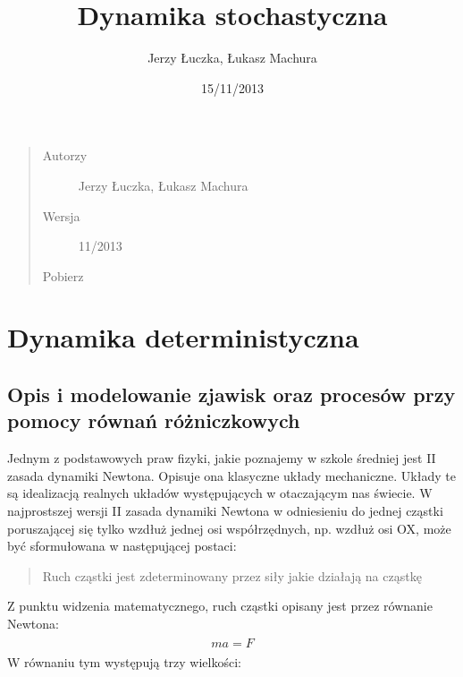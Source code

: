 \documentclass[a4paper,12pt,polish]{sphinxmanual}
\title{Dynamika stochastyczna}
\date{15/11/2013}
\author{Jerzy Łuczka, Łukasz Machura}
\begin{document}
\maketitle
\tableofcontents
{}\label{index::doc}

\begin{quote}\begin{description}
\item[{Autorzy}] \leavevmode
Jerzy Łuczka,
Łukasz Machura

\item[{Wersja}]  11/2013

\item[{Pobierz}] \leavevmode
{}

\end{description}\end{quote}


\chapter{Dynamika deterministyczna}
\label{index:dynamika-stochastyczna}\label{index:dynamika-deterministyczna}

\section{Opis i modelowanie zjawisk oraz procesów przy pomocy równań różniczkowych}
\label{ch1/chI011:opis-i-modelowanie-zjawisk-oraz-procesow-przy-pomocy-rownan-rozniczkowych}\label{ch1/chI011::doc}
Jednym z podstawowych praw fizyki, jakie poznajemy w szkole średniej jest II zasada dynamiki Newtona. Opisuje ona klasyczne układy mechaniczne. Układy te są idealizacją realnych układów występujących w otaczającym nas świecie. W najprostszej wersji II zasada dynamiki Newtona w odniesieniu do jednej cząstki poruszającej się tylko wzdłuż jednej osi współrzędnych, np. wzdłuż osi OX, może być sformułowana w następującej postaci:
\begin{quote}

Ruch cząstki jest zdeterminowany przez siły jakie działają na cząstkę
\end{quote}

Z punktu widzenia matematycznego, ruch cząstki opisany jest przez równanie Newtona:
\label{ch1/chI011:equation-eqn1}\begin{gather}
\begin{split}m a = F\end{split}\label{ch1/chI011-eqn1}
\end{gather}
W równaniu tym występują trzy wielkości:
\end{document}
